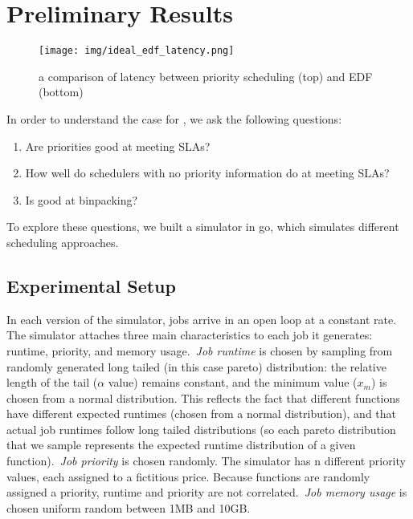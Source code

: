 \section{Preliminary Results}

\begin{figure}[t!]
    \centering
      \texttt{[image: img/ideal\_edf\_latency.png]}
      \caption{ a comparison of latency between priority scheduling (top) and EDF (bottom) }
    \label{fig:edf-vs-prio}
\end{figure}



In order to understand the case for \sys{}, we ask the following questions: 
\begin{enumerate}
    \item Are priorities good at meeting SLAs?
    \item How well do schedulers with no priority information do at meeting SLAs?
    \item Is \sys{} good at binpacking?
\end{enumerate}


To explore these questions, we built a simulator in go\cite{TODO}, which
simulates different scheduling approaches.


\subsection{Experimental Setup}

In each version of the simulator, jobs arrive in an open loop at a constant
rate. The simulator attaches three main characteristics to each job it
generates: runtime, priority, and memory usage.\ \textit{Job runtime} is chosen
by sampling from randomly generated long tailed (in this case pareto)
distribution: the relative length of the tail ($\alpha$ value) remains constant,
and the minimum value ($x_m$) is chosen from a normal distribution. This
reflects the fact that different functions have different expected runtimes
(chosen from a normal distribution), and that actual job runtimes follow long
tailed distributions (so each pareto distribution that we sample represents the
expected runtime distribution of a given function).\ \textit{Job priority} is
chosen randomly. The simulator has n different priority values, each assigned to
a fictitious price. Because functions are randomly assigned a priority, runtime
and priority are not correlated.\ \textit{Job memory usage} is chosen uniform
random between 1MB and 10GB.


